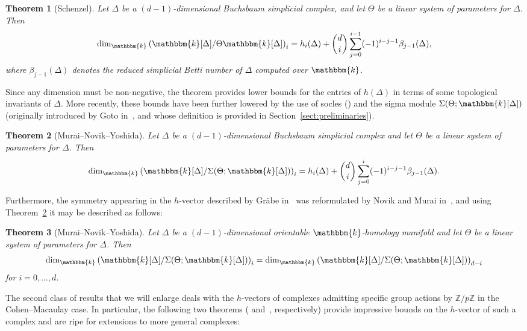 \documentclass[10pt]{amsart}
\newtheorem{theo}{Theorem}[section]
\theoremstyle{definition}
\newcommand{\field}{\mathbbm{k}}
\newcommand{\ZZ}{{\mathbb Z}}
\begin{document}
\begin{theo}[Schenzel]\label{Schenzel}
Let $\Delta$ be a $(d-1)$-dimensional Buchsbaum simplicial complex, and let $\Theta$ be a linear system of parameters for $\Delta$. Then
\[
\dim_\field \left(\field[\Delta]/\Theta\field[\Delta]\right)_i= h_i(\Delta)+\binom{d}{i}\sum_{j=0}^{i-1}(-1)^{i-j-1}\beta_{j-1}(\Delta),
\]
where $\beta_{j-1}(\Delta)$ denotes the reduced simplicial Betti number of $\Delta$ computed over $\field$.
\end{theo}

Since any dimension must be non-negative, the theorem provides lower bounds for the entries of $h(\Delta)$ in terms of some topological invariants of $\Delta$. More recently, these bounds have been further lowered by the use of socles (\cite{NS-Socle}) and the sigma module $\Sigma(\Theta; \field[\Delta])$ (originally introduced by Goto in~\cite{Goto}, and whose definition is provided in Section~\ref{sect:preliminaries}).

\begin{theo}[Murai--Novik--Yoshida]\label{NS-Socle}
Let $\Delta$ be a $(d-1)$-dimensional Buchsbaum simplicial complex
and let $\Theta$ be a linear system of parameters for $\Delta$. Then
\[
\dim_\field \left(\field[\Delta]/\Sigma(\Theta; \field[\Delta])\right)_i= h_i(\Delta)+\binom{d}{i}\sum_{j=0}^{i}(-1)^{i-j-1}\beta_{j-1}(\Delta).
\]
\end{theo}

Furthermore, the symmetry appearing in the $h$-vector described by Gr\"abe in~\cite{GrabeDS} was reformulated by Novik and Murai in~\cite[Proposition~1.1]{FaceNumbers}, and using Theorem~\ref{NS-Socle} it may be described as follows:

\begin{theo}[Murai--Novik--Yoshida]\label{Duality}
Let $\Delta$ be a $(d-1)$-dimensional %
orientable $\mathbbm{k}$-homology manifold
and let $\Theta$ be a linear system of parameters for $\Delta$. Then
\[
\dim_\field \left(\field[\Delta]/\Sigma(\Theta; \field[\Delta])\right)_i=\dim_\field \left(\field[\Delta]/\Sigma(\Theta; \field[\Delta])\right)_{d-i}
\]
for $i=0, \ldots, d$.
\end{theo}

The second class of results that we will enlarge deals with the $h$-vectors of complexes admitting specific group actions by $\ZZ/p\ZZ$ in the Cohen--Macaulay case. In particular, the following two theorems (\cite[Theorem~3.2]{St-87} and~\cite[Theorem~3.3]{AdinThesis}, respectively) provide impressive bounds on the $h$-vector of such a complex and are ripe for extensions to more general complexes:
\end{document}
